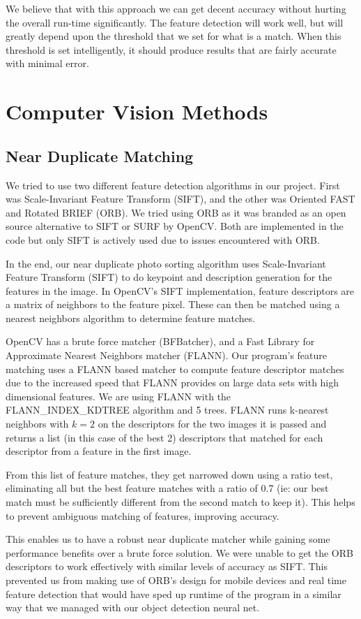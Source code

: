 \documentclass[12pt]{article}
\begin{document}
	We believe that with this approach we can get decent accuracy without hurting the overall run-time significantly. The feature detection will work well, but will greatly depend upon the threshold that we set for what is a match. When this threshold is set intelligently, it should produce results that are fairly accurate with minimal error.

\section{Computer Vision Methods}
\subsection{Near Duplicate Matching}
	We tried to use two different feature detection algorithms in our project. First was Scale-Invariant Feature Transform (SIFT), and the other was Oriented FAST and Rotated BRIEF (ORB). We tried using ORB as it was branded as an open source alternative to SIFT or SURF by OpenCV. Both are implemented in the code but only SIFT is actively used due to issues encountered with ORB.
	
	In the end, our near duplicate photo sorting algorithm uses Scale-Invariant Feature Transform (SIFT) to do keypoint and description generation for the features in the image. In OpenCV's SIFT implementation, feature descriptors are a matrix of neighbors to the feature pixel. These can then be matched using a nearest neighbors algorithm to determine feature matches. 
	
	OpenCV has a brute force matcher (BFBatcher), and a Fast Library for Approximate Nearest Neighbors matcher (FLANN). Our program's feature matching uses a FLANN based matcher to compute feature descriptor matches due to the increased speed that FLANN provides on large data sets with high dimensional features. We are using FLANN with the FLANN\_INDEX\_KDTREE algorithm and 5 trees. FLANN runs k-nearest neighbors with $k=2$ on the descriptors for the two images it is passed and returns a list (in this case of the best 2) descriptors that matched for each descriptor from a feature in the first image.
	
	From this list of feature matches, they get narrowed down using a ratio test, eliminating all but the best feature matches with a ratio of 0.7 (ie: our best match must be  sufficiently different from the second match to keep it). This helps to prevent ambiguous matching of features, improving accuracy.
	
	This enables us to have a robust near duplicate matcher while gaining some performance benefits over a brute force solution. We were unable to get the ORB descriptors to work effectively with similar levels of accuracy as SIFT. This prevented us from making use of ORB's design for mobile devices and real time feature detection that would have sped up runtime of the program in a similar way that we managed with our object detection neural net.
	
\end{document}
